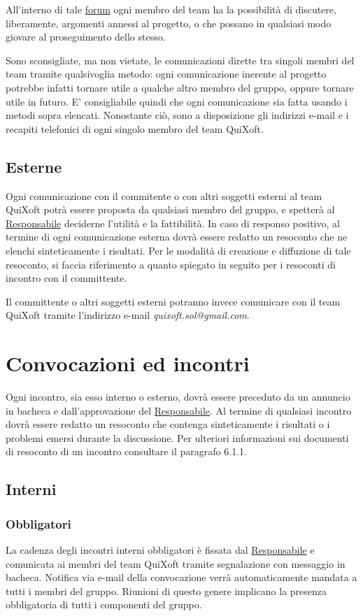 \documentclass[11pt,a4paper]{article}
\begin{document}
All'interno di tale \underline{forum} ogni membro del team ha la possibilità di discu\-tere, liberamente, argomenti annessi al
progetto, o che possano in qualsiasi modo giovare al proseguimento dello stesso.

Sono sconsigliate, ma non vietate, le comunicazioni dirette tra singoli membri del team tramite qualsivoglia metodo: ogni comunicazione ineren\-te al progetto potrebbe infatti tornare utile a qualche altro membro del gruppo, oppure tornare utile in futuro.
E' consigliabile quindi che ogni comunicazione sia fatta usando i metodi sopra elencati.
Nonostante ciò, sono a disposizione gli indirizzi e-mail e i recapiti telefonici di ogni singolo membro del team QuiXoft.
\subsection{Esterne}
Ogni comunicazione con il commitente o con altri soggetti esterni al team QuiXoft potrà essere proposta da qualsiasi membro del gruppo, e spetterà al \underline{Responsabile} deciderne l'utilità e la fattibilità.
In caso di responso positivo, al termine di ogni comunicazione esterna dovrà essere redatto un resoconto che ne elenchi sinteticamente i risultati. Per le modalità di creazione e diffuzione di tale resoconto, si faccia riferimento a quanto spiegato in seguito per i resoconti di incontro con il committente.

Il committente o altri soggetti esterni potranno invece comunicare con il team QuiXoft tramite l'indirizzo e-mail \textit{quixoft.sol@gmail.com}.
\section{Convocazioni ed incontri}
Ogni incontro, sia esso interno o esterno, dovrà essere preceduto da un annuncio in bacheca e dall'approvazione del \underline{Responsabile}.
Al termine di qualsiasi incontro dovrà essere redatto un resoconto che contenga sinteticamente i risultati o i problemi emersi durante la discussione.
Per ulteriori informazioni sui documenti di resoconto di un incontro consultare il paragrafo 6.1.1.
\subsection{Interni}
\subsubsection{Obbligatori}
La cadenza degli incontri interni obbligatori è fissata dal \underline{Responsabile} e comunicata ai membri del team QuiXoft tramite segnalazione con messaggio in bacheca.
Notifica via e-mail della convocazione verrà automaticamente mandata a tutti i membri del gruppo.
Riunioni di questo genere implicano la presenza obbligatoria di tutti i componenti del gruppo.
\end{document}
